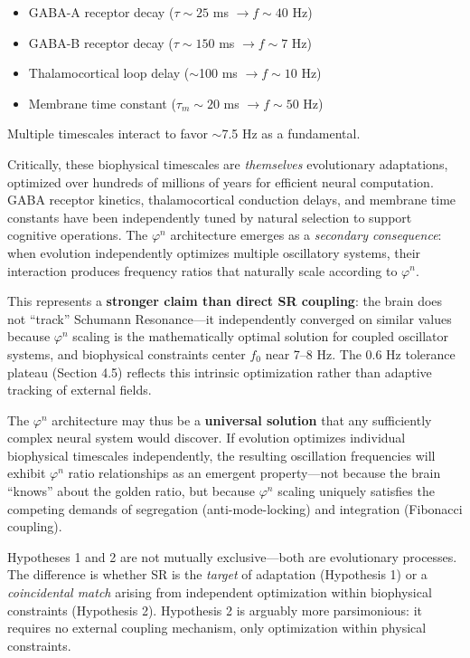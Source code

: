 \documentclass[11pt,a4paper]{article}
\newcommand{\phisym}{\varphi}
\newcommand{\fzero}{f_0}
\begin{document}
\begin{itemize}
    \item GABA-A receptor decay ($\tau \sim 25$ ms $\rightarrow f \sim 40$ Hz)
    \item GABA-B receptor decay ($\tau \sim 150$ ms $\rightarrow f \sim 7$ Hz)
    \item Thalamocortical loop delay ($\sim$100 ms $\rightarrow f \sim 10$ Hz)
    \item Membrane time constant ($\tau_m \sim 20$ ms $\rightarrow f \sim 50$ Hz)
\end{itemize}

Multiple timescales interact to favor $\sim$7.5 Hz as a fundamental.

Critically, these biophysical timescales are \textit{themselves} evolutionary adaptations, optimized over hundreds of millions of years for efficient neural computation. GABA receptor kinetics, thalamocortical conduction delays, and membrane time constants have been independently tuned by natural selection to support cognitive operations. The $\phisym^n$ architecture emerges as a \textit{secondary consequence}: when evolution independently optimizes multiple oscillatory systems, their interaction produces frequency ratios that naturally scale according to $\phisym^n$.

This represents a \textbf{stronger claim than direct SR coupling}: the brain does not ``track'' Schumann Resonance---it independently converged on similar values because $\phisym^n$ scaling is the mathematically optimal solution for coupled oscillator systems, and biophysical constraints center $\fzero$ near 7--8 Hz. The 0.6 Hz tolerance plateau (Section 4.5) reflects this intrinsic optimization rather than adaptive tracking of external fields.

The $\phisym^n$ architecture may thus be a \textbf{universal solution} that any sufficiently complex neural system would discover. If evolution optimizes individual biophysical timescales independently, the resulting oscillation frequencies will exhibit $\phisym^n$ ratio relationships as an emergent property---not because the brain ``knows'' about the golden ratio, but because $\phisym^n$ scaling uniquely satisfies the competing demands of segregation (anti-mode-locking) and integration (Fibonacci coupling).

\begin{keyinsight}
Hypotheses 1 and 2 are not mutually exclusive---both are evolutionary processes. The difference is whether SR is the \textit{target} of adaptation (Hypothesis 1) or a \textit{coincidental match} arising from independent optimization within biophysical constraints (Hypothesis 2). Hypothesis 2 is arguably more parsimonious: it requires no external coupling mechanism, only optimization within physical constraints.
\end{keyinsight}
\end{document}
